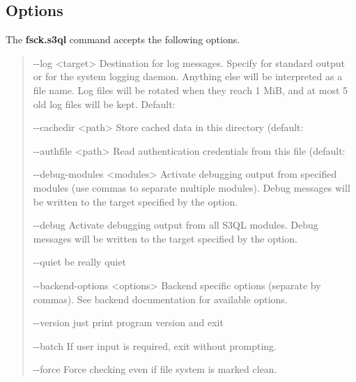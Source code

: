 \documentclass[letterpaper,10pt,english]{sphinxmanual}
\begin{document}
\subsection{Options}
\label{man/fsck:options}
The \textbf{fsck.s3ql} command accepts the following options.
\begin{quote}
\begin{optionlist}{3cm}
\item [-{-}log \textless{}target\textgreater{}]  
Destination for log messages. Specify  for
standard output or  for the system logging
daemon. Anything else will be interpreted as a file
name. Log files will be rotated when they reach 1 MiB,
and at most 5 old log files will be kept. Default:
\item [-{-}cachedir \textless{}path\textgreater{}]  
Store cached data in this directory (default:
\item [-{-}authfile \textless{}path\textgreater{}]  
Read authentication credentials from this file
(default: 
\item [-{-}debug-modules \textless{}modules\textgreater{}]  
Activate debugging output from specified modules (use
commas to separate multiple modules). Debug messages
will be written to the target specified by the
 option.
\item [-{-}debug]  
Activate debugging output from all S3QL modules. Debug
messages will be written to the target specified by
the  option.
\item [-{-}quiet]  
be really quiet
\item [-{-}backend-options \textless{}options\textgreater{}]  
Backend specific options (separate by commas). See
backend documentation for available options.
\item [-{-}version]  
just print program version and exit
\item [-{-}batch]  
If user input is required, exit without prompting.
\item [-{-}force]  
Force checking even if file system is marked clean.
\end{optionlist}
\end{quote}
\end{document}
